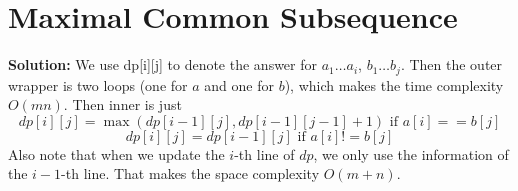 \section{Maximal Common Subsequence}
{\bf Solution:} We use dp[i][j] to denote the answer for $a_1\dots a_i$, $b_1\dots b_j$. Then the outer wrapper is two loops (one for $a$ and one for $b$), which makes the time complexity $O(mn)$. Then inner is just
\[
dp[i][j] = \max(dp[i-1][j], dp[i-1][j-1]+1) \text{ if } a[i] == b[j]
\]
\[
dp[i][j] = dp[i-1][j] \text{ if } a[i] != b[j]
\]
Also note that when we update the $i$-th line of $dp$, we only use the information of the $i-1$-th line. That makes the space complexity $O(m+n)$.